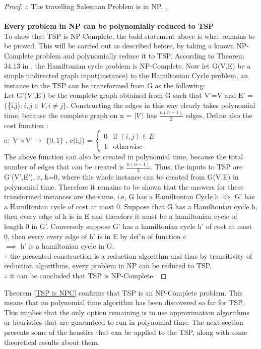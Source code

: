 \documentclass{article}
\begin{document}
\begin{proof}
$\therefore$ The travelling Salesman Problem is in NP. \cite{cormen_leiserson_rivest_stein}, \cite{rowell}\\
\\
\textbf{Every problem in NP can be polynomially reduced to TSP}\\
To show that TSP is NP-Complete, the bold statement above is what remains to be proved. This will be carried out as described before, by taking a known NP-Complete problem and polynomially reduce it to TSP. According to Theorem 34.13 in \cite{cormen_leiserson_rivest_stein}, the Hamiltonian cycle problem is NP-Complete. Now let G(V,E) be a simple undirected graph input(instance) to the Hamiltonian Cycle problem, an instance to the TSP can be transformed from G as the following:\\
Let G'(V',E') be the complete graph obtained from G such that V'=V and E' = $\{$\{i,j\}$ : i,j \in V , i \ne j \}$. Constructing the edges in this way clearly takes polynomial time, because the complete graph on n = $\abs{V}$ has $\frac{n(n-1)}{2}$ edges. Define also the cost function :\\
c$\colon$ V'$\times$V'$\to$ $\{0,1\}$ , c(i,j) = $\begin{cases} 0& \text{if } (i,j) \in E\\ 1              & \text{otherwise} \end{cases}$\\
The above function can also be created in polynomial time, because the total number of edges that can be created is $\frac{n(n-1)}{2}$. Thus, the inputs to TSP are G'(V',E'), c, k=0, where this whole instance can be created from G(V,E) in polynomial time. Therefore it remains to be shown that the answers for these transformed instances are the same, i.e, G has a Hamiltonian Cycle h $\iff$ G' has a Hamiltonian cycle of cost at most 0. Suppose that G has a Hamiltonian cycle h, then every edge of h is in E and therefore it must be a hamiltonian cycle of length 0 in G'. Conversely suppose G' has a hamiltonian cycle h' of cost at most 0, then every every edge of h' is in E by def'n of function c\\
$\implies$ h' is a hamiltonian cycle in G.\\
$\therefore$ the presented construction is a reduction algorithm and thus by transitivity of reduction algorithms, every problem in NP can be reduced to TSP.\\
$\therefore$ it can be concluded that TSP is NP-Complete. \cite{cormen_leiserson_rivest_stein}
\end{proof}
Theorem \ref{TSP is NPC} confirms that TSP is an NP-Complete problem. This means that no polynomial time algorithm has been discovered so far for TSP. This implies that the only option remaining is to use approximation algorithms or heuristics that are guaranteed to run in polynomial time. The next section presents some of the heustics that can be applied to the TSP, along with some theoretical results about them.
\newpage
\end{document}
